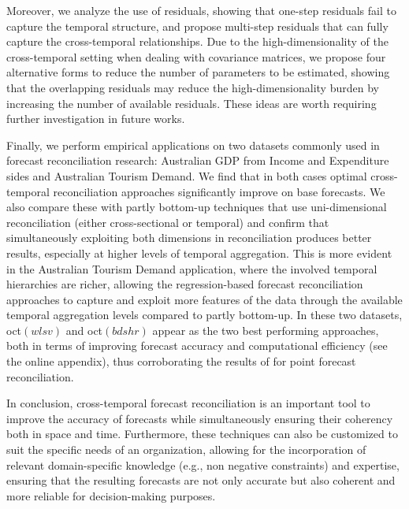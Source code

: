 \documentclass[a4paper,11pt]{article}
\theoremstyle{definition}
\begin{document}
Moreover, we analyze the use of residuals, showing that one-step residuals fail to capture the temporal structure, and propose multi-step residuals that can fully capture the cross-temporal relationships. Due to the high-dimensionality of the cross-temporal setting when dealing with covariance matrices, we propose four alternative forms to reduce the number of parameters to be estimated, showing that the overlapping residuals may reduce the high-dimensionality burden by increasing the number of available residuals. These ideas are worth requiring further investigation in future works.

Finally, we perform empirical applications on two datasets commonly used in forecast reconciliation research: Australian GDP from Income and Expenditure sides and Australian Tourism Demand. We find that in both cases optimal cross-temporal reconciliation approaches significantly improve on base forecasts. We also compare these with partly bottom-up techniques that use uni-dimensional reconciliation (either cross-sectional or temporal) and confirm that simultaneously exploiting both dimensions in reconciliation produces better results, especially at higher levels of temporal aggregation.
This is more evident in the Australian Tourism Demand application, where the involved temporal hierarchies are richer, allowing the regression-based forecast reconciliation approaches to capture and exploit more features of the data through the available temporal aggregation levels \citep{kourentzes2014, kourentzes2016, kourentzes2017} compared to partly bottom-up. In these two datasets, oct$(wlsv)$ and oct$(bdshr)$ appear as the two best performing approaches, both in terms of improving forecast accuracy and computational efficiency (see the online appendix), thus corroborating the results of \cite{difonzo2023} for point forecast reconciliation.


In conclusion, cross-temporal forecast reconciliation is an important tool to improve the accuracy of forecasts while simultaneously ensuring their coherency both in space and time. Furthermore, these techniques can also be customized to suit the specific needs of an organization, allowing for the incorporation of relevant domain-specific knowledge (e.g., non negative constraints) and expertise, ensuring that the resulting forecasts are not only accurate but also coherent and more reliable for decision-making purposes.
\end{document}
